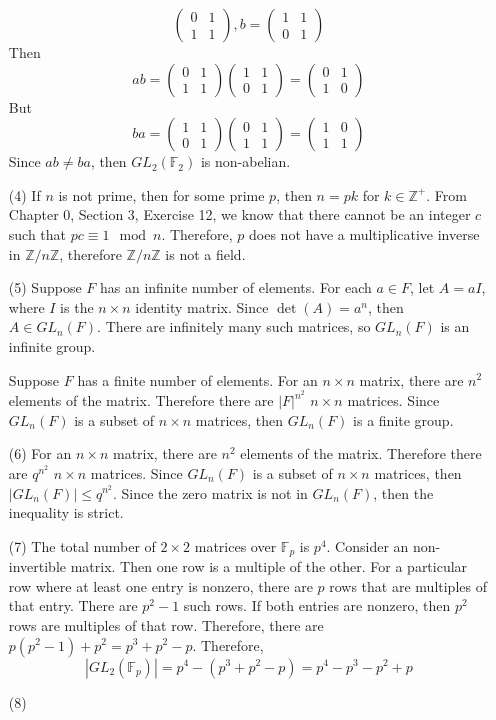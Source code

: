 \documentclass[12pt]{article}
\begin{document}
\begin{itemize}
$$\begin{pmatrix}
0 & 1 \\
1 & 1
\end{pmatrix}, b = \begin{pmatrix}
1 & 1 \\
0 & 1
\end{pmatrix}$$
Then
$$ab = \begin{pmatrix}
0 & 1 \\
1 & 1
\end{pmatrix}\begin{pmatrix}
1 & 1 \\
0 & 1
\end{pmatrix} = \begin{pmatrix}
0 & 1 \\
1 & 0
\end{pmatrix}$$
But
$$ba = \begin{pmatrix}
1 & 1 \\
0 & 1
\end{pmatrix}\begin{pmatrix}
0 & 1 \\
1 & 1
\end{pmatrix} = \begin{pmatrix}
1 & 0 \\
1 & 1
\end{pmatrix}$$
Since $ab \neq ba$, then $GL_2(\mathbb{F}_2)$ is non-abelian.
\item[(4)]
If $n$ is not prime, then for some prime $p$, then $n = pk$ for $k \in \mathbb{Z}^+$. From Chapter 0, Section 3, Exercise 12, we know that there cannot be an integer $c$ such that $pc \equiv 1 \mod n$. Therefore, $p$ does not have a multiplicative inverse in $\mathbb{Z}/n\mathbb{Z}$, therefore $\mathbb{Z}/n\mathbb{Z}$ is not a field.
\item[(5)]
Suppose $F$ has an infinite number of elements. For each $a \in F$, let $A = aI$, where $I$ is the $n \times n$ identity matrix. Since $\det(A) = a^n$, then $A \in GL_n(F)$. There are infinitely many such matrices, so $GL_n(F)$ is an infinite group.

Suppose $F$ has a finite number of elements. For an $n \times n$ matrix, there are $n^2$ elements of the matrix. Therefore there are $|F|^{n^2}$ $n \times n$ matrices. Since $GL_n(F)$ is a subset of $n \times n$ matrices, then $GL_n(F)$ is a finite group.
\item[(6)]
For an $n \times n$ matrix, there are $n^2$ elements of the matrix. Therefore there are $q^{n^2}$ $n \times n$ matrices. Since $GL_n(F)$ is a subset of $n \times n$ matrices, then $|GL_n(F)| \leq q^{n^2}$. Since the zero matrix is not in $GL_n(F)$, then the inequality is strict.
\item[(7)]
The total number of $2 \times 2$ matrices over $\mathbb{F}_p$ is $p^4$. Consider an non-invertible matrix. Then one row is a multiple of the other. For a particular row where at least one entry is nonzero, there are $p$ rows that are multiples of that entry. There are $p^2 - 1$ such rows. If both entries are nonzero, then $p^2$ rows are multiples of that row. Therefore, there are $p(p^2 - 1) + p^2 = p^3 + p^2 - p$. Therefore,
$$|GL_2(\mathbb{F}_p)| = p^4 - (p^3 + p^2 - p) = p^4 - p^3 - p^2 + p$$
\item[(8)]
\end{itemize}
\end{document}
